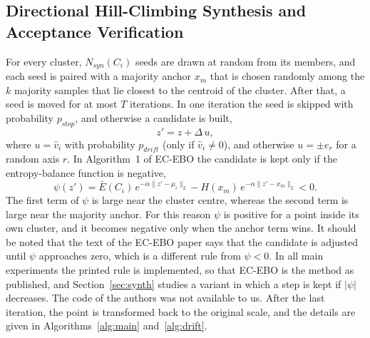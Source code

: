 \documentclass[preprint,10pt]{elsarticle}
\let\OldSubsection\subsection
\renewcommand{\subsection}{\OldSubsection}
\begin{document}
\subsection{Directional Hill-Climbing Synthesis and Acceptance Verification}\label{sec:rule}
For every cluster, $N_{syn}(C_i)$ seeds are drawn at random from its members, and each seed is paired with a majority anchor $x_m$ that is chosen randomly among the $k$ majority samples that lie closest to the centroid of the cluster. After that, a seed is moved for at most $T$ iterations. In one iteration the seed is skipped with probability $p_{stop}$, and otherwise a candidate is built,
\begin{equation}
z'=z+\Delta\,u,
\end{equation}
where $u=\hat v_i$ with probability $p_{drift}$ (only if $\hat v_i\neq0$), and otherwise $u=\pm e_r$ for a random axis $r$. In Algorithm~1 of EC-EBO the candidate is kept only if the entropy-balance function is negative,
\begin{equation}
\psi(z')=\bar E(C_i)\,e^{-\alpha\|z'-\mu_i\|_2}-H(x_m)\,e^{-\alpha\|z'-x_m\|_2}<0.
\end{equation}
The first term of $\psi$ is large near the cluster centre, whereas the second term is large near the majority anchor. For this reason $\psi$ is positive for a point inside its own cluster, and it becomes negative only when the anchor term wins. It should be noted that the text of the EC-EBO paper says that the candidate is adjusted until $\psi$ approaches zero, which is a different rule from $\psi<0$. In all main experiments the printed rule is implemented, so that EC-EBO is the method as published, and Section~\ref{sec:synth} studies a variant in which a step is kept if $|\psi|$ decreases. The code of the authors was not available to us. After the last iteration, the point is transformed back to the original scale, and the details are given in Algorithms~\ref{alg:main} and~\ref{alg:drift}.
\end{document}
